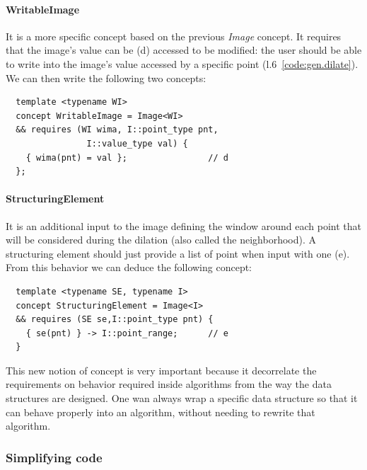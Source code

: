 \paragraph{WritableImage} It is a more specific concept based on the previous \emph{Image} concept. It requires that the
image's value can be (d) accessed to be modified: the user should be able to write into the image's value accessed by a
specific point (l.6~\ref{code:gen.dilate}). We can then write the following two concepts:
\begin{verbatim}
  template <typename WI>
  concept WritableImage = Image<WI>
  && requires (WI wima, I::point_type pnt,
                I::value_type val) {
    { wima(pnt) = val };                // d
  };
\end{verbatim}

\paragraph{StructuringElement} It is an additional input to the image defining the window around each point that will be
considered during the dilation (also called the neighborhood). A structuring element should just provide a list of point
when input with one (e). From this behavior we can deduce the following concept:
\begin{verbatim}
  template <typename SE, typename I>
  concept StructuringElement = Image<I>
  && requires (SE se,I::point_type pnt) {
    { se(pnt) } -> I::point_range;      // e
  }
\end{verbatim}

This new notion of concept is very important because it decorrelate the requirements on behavior required inside
algorithms from the way the data structures are designed. One wan always wrap a specific data structure so that it can
behave properly into an algorithm, without needing to rewrite that algorithm.

\subsubsection{Simplifying code}
\label{subsec:simplifying}


